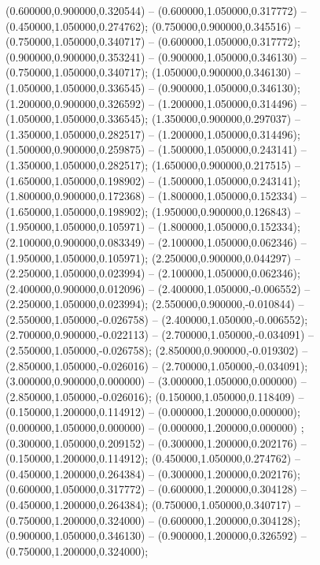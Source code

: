  (0.600000,0.900000,0.320544) -- (0.600000,1.050000,0.317772) -- (0.450000,1.050000,0.274762);
 (0.750000,0.900000,0.345516) -- (0.750000,1.050000,0.340717) -- (0.600000,1.050000,0.317772);
 (0.900000,0.900000,0.353241) -- (0.900000,1.050000,0.346130) -- (0.750000,1.050000,0.340717);
 (1.050000,0.900000,0.346130) -- (1.050000,1.050000,0.336545) -- (0.900000,1.050000,0.346130);
 (1.200000,0.900000,0.326592) -- (1.200000,1.050000,0.314496) -- (1.050000,1.050000,0.336545);
 (1.350000,0.900000,0.297037) -- (1.350000,1.050000,0.282517) -- (1.200000,1.050000,0.314496);
 (1.500000,0.900000,0.259875) -- (1.500000,1.050000,0.243141) -- (1.350000,1.050000,0.282517);
 (1.650000,0.900000,0.217515) -- (1.650000,1.050000,0.198902) -- (1.500000,1.050000,0.243141);
 (1.800000,0.900000,0.172368) -- (1.800000,1.050000,0.152334) -- (1.650000,1.050000,0.198902);
 (1.950000,0.900000,0.126843) -- (1.950000,1.050000,0.105971) -- (1.800000,1.050000,0.152334);
 (2.100000,0.900000,0.083349) -- (2.100000,1.050000,0.062346) -- (1.950000,1.050000,0.105971);
 (2.250000,0.900000,0.044297) -- (2.250000,1.050000,0.023994) -- (2.100000,1.050000,0.062346);
 (2.400000,0.900000,0.012096) -- (2.400000,1.050000,-0.006552) -- (2.250000,1.050000,0.023994);
 (2.550000,0.900000,-0.010844) -- (2.550000,1.050000,-0.026758) -- (2.400000,1.050000,-0.006552);
 (2.700000,0.900000,-0.022113) -- (2.700000,1.050000,-0.034091) -- (2.550000,1.050000,-0.026758);
 (2.850000,0.900000,-0.019302) -- (2.850000,1.050000,-0.026016) -- (2.700000,1.050000,-0.034091);
 (3.000000,0.900000,0.000000) -- (3.000000,1.050000,0.000000) -- (2.850000,1.050000,-0.026016);
 (0.150000,1.050000,0.118409) -- (0.150000,1.200000,0.114912) -- (0.000000,1.200000,0.000000);
 (0.000000,1.050000,0.000000) -- (0.000000,1.200000,0.000000) ;
 (0.300000,1.050000,0.209152) -- (0.300000,1.200000,0.202176) -- (0.150000,1.200000,0.114912);
 (0.450000,1.050000,0.274762) -- (0.450000,1.200000,0.264384) -- (0.300000,1.200000,0.202176);
 (0.600000,1.050000,0.317772) -- (0.600000,1.200000,0.304128) -- (0.450000,1.200000,0.264384);
 (0.750000,1.050000,0.340717) -- (0.750000,1.200000,0.324000) -- (0.600000,1.200000,0.304128);
 (0.900000,1.050000,0.346130) -- (0.900000,1.200000,0.326592) -- (0.750000,1.200000,0.324000);
